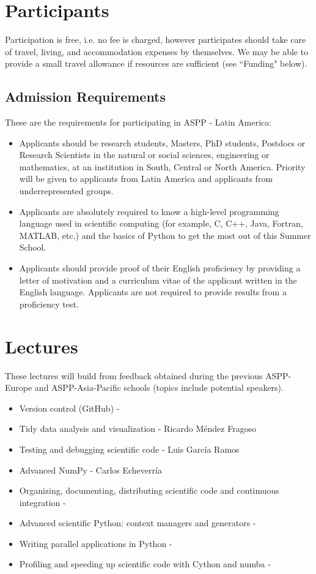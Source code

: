 \documentclass{article}[11pt]
\begin{document}
\section*{Participants}
Participation is free, i.e. no fee is charged, however participates should take 
care of travel, living, and accommodation expenses by themselves.
We may be able to provide a small travel allowance if resources are sufficient 
(see ``Funding" below).

\subsection*{Admission Requirements}
These are the requirements for participating in ASPP - Latin America:
\begin{itemize}
    \item Applicants should be research students, Masters, PhD students, 
    Postdocs or Research Scientists in the natural or social sciences, 
    engineering or mathematics, at an institution in South, Central or 
    North America. Priority will be given to applicants from Latin America 
    and applicants from underrepresented groups.
    \item Applicants are absolutely required to know a high-level programming 
    language used in scientific computing (for example, C, C++, Java, Fortran, 
    MATLAB, etc.) and the basics of Python to get the most out of this Summer 
    School.
    \item Applicants should provide proof of their English proficiency by 
    providing a letter of motivation and a curriculum vitae of the applicant 
    written in the English language. Applicants are not required to provide 
    results from a proficiency test.
\end{itemize}

\section*{Lectures}%

These lectures will build from feedback obtained during the previous 
ASPP-Europe and ASPP-Asia-Pacific schools (topics include
potential speakers).

\begin{itemize}
    \item Version control (GitHub) - 
    \item Tidy data analysis and visualization - Ricardo M\'endez Fragoso 
    \item Testing and debugging scientific code - Luis Garc\'{i}a Ramos
    \item Advanced NumPy - Carlos Echeverr\'{i}a
    \item Organizing, documenting, distributing  scientific code and 
    contimuous integration - 
    \item Advanced scientific Python: context managers and generators - 
    \item Writing parallel applications in Python - 
    \item Profiling and speeding up scientific code with Cython and numba - 
\end{itemize}
\end{document}

